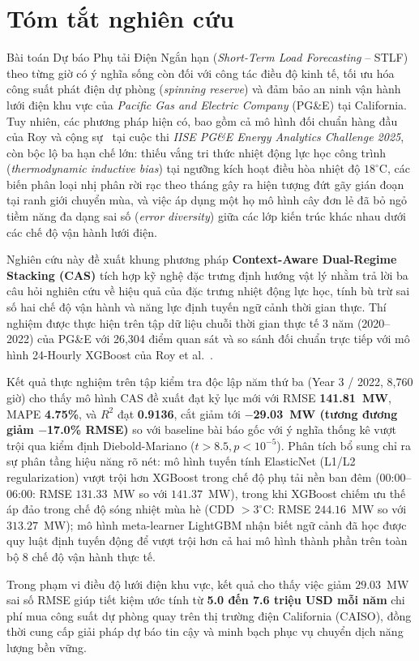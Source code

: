 \section{Tóm tắt nghiên cứu}
\label{sec:abstract}

Bài toán Dự báo Phụ tải Điện Ngắn hạn (\textit{Short-Term Load Forecasting} -- STLF) theo từng giờ có ý nghĩa sống còn đối với công tác điều độ kinh tế, tối ưu hóa công suất phát điện dự phòng (\textit{spinning reserve}) và đảm bảo an ninh vận hành lưới điện khu vực của \textit{Pacific Gas and Electric Company} (PG\&E) tại California. Tuy nhiên, các phương pháp hiện có, bao gồm cả mô hình đối chuẩn hàng đầu của Roy và cộng sự~\cite{roy2025hourly} tại cuộc thi \textit{IISE PG\&E Energy Analytics Challenge 2025}, còn bộc lộ ba hạn chế lớn: thiếu vắng tri thức nhiệt động lực học công trình (\textit{thermodynamic inductive bias}) tại ngưỡng kích hoạt điều hòa nhiệt độ $18^\circ\text{C}$, các biến phân loại nhị phân rời rạc theo tháng gây ra hiện tượng đứt gãy gián đoạn tại ranh giới chuyển mùa, và việc áp dụng một họ mô hình cây đơn lẻ đã bỏ ngỏ tiềm năng đa dạng sai số (\textit{error diversity}) giữa các lớp kiến trúc khác nhau dưới các chế độ vận hành lưới điện. 

Nghiên cứu này đề xuất khung phương pháp \textbf{Context-Aware Dual-Regime Stacking (CAS)} tích hợp kỹ nghệ đặc trưng định hướng vật lý nhằm trả lời ba câu hỏi nghiên cứu về hiệu quả của đặc trưng nhiệt động lực học, tính bù trừ sai số hai chế độ vận hành và năng lực định tuyến ngữ cảnh thời gian thực. Thí nghiệm được thực hiện trên tập dữ liệu chuỗi thời gian thực tế 3 năm (2020--2022) của PG\&E với 26,304 điểm quan sát và so sánh đối chuẩn trực tiếp với mô hình 24-Hourly XGBoost của Roy et al.~\cite{roy2025hourly}. 

Kết quả thực nghiệm trên tập kiểm tra độc lập năm thứ ba (Year 3 / 2022, 8,760 giờ) cho thấy mô hình CAS đề xuất đạt kỷ lục mới với RMSE \textbf{141.81~MW}, MAPE \textbf{4.75\%}, và $R^2$ đạt \textbf{0.9136}, cắt giảm tới \textbf{$-$29.03~MW (tương đương giảm $-$17.0\% RMSE)} so với baseline bài báo gốc với ý nghĩa thống kê vượt trội qua kiểm định Diebold-Mariano ($t > 8.5, p < 10^{-5}$). Phân tích bổ sung chỉ ra sự phân tầng hiệu năng rõ nét: mô hình tuyến tính ElasticNet (L1/L2 regularization) vượt trội hơn XGBoost trong chế độ phụ tải nền ban đêm (00:00--06:00: RMSE $131.33$~MW so với $141.37$~MW), trong khi XGBoost chiếm ưu thế áp đảo trong chế độ sóng nhiệt mùa hè (CDD $> 3^\circ\text{C}$: RMSE $244.16$~MW so với $313.27$~MW); mô hình meta-learner LightGBM nhận biết ngữ cảnh đã học được quy luật định tuyến động để vượt trội hơn cả hai mô hình thành phần trên toàn bộ 8 chế độ vận hành thực tế. 

Trong phạm vi điều độ lưới điện khu vực, kết quả cho thấy việc giảm $29.03$~MW sai số RMSE giúp tiết kiệm ước tính từ \textbf{5.0 đến 7.6 triệu USD mỗi năm} chi phí mua công suất dự phòng quay trên thị trường điện California (CAISO), đồng thời cung cấp giải pháp dự báo tin cậy và minh bạch phục vụ chuyển dịch năng lượng bền vững.

